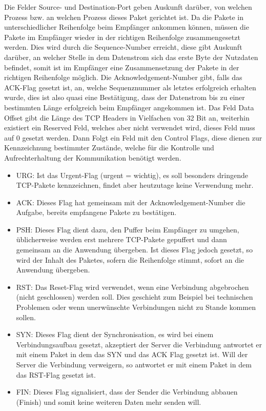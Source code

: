 \documentclass[a4paper,14pt,headsepline]{scrartcl}
\begin{document}
Die Felder Source- und Destination-Port geben Auskunft darüber, von welchen Prozess bzw. an welchen Prozess dieses Paket gerichtet ist. Da die Pakete in unterschiedlicher Reihenfolge beim Empfänger ankommen können, müssen die Pakete im Empfänger wieder in der richtigen Reihenfolge zusammengesetzt werden. Dies wird durch die Sequence-Number erreicht, diese gibt Auskunft darüber, an welcher Stelle in dem Datenstrom sich das erste Byte der Nutzdaten befindet, somit ist im Empfänger eine Zusammensetzung der Pakete in der richtigen Reihenfolge möglich. Die Acknowledgement-Number gibt, falls das ACK-Flag gesetzt ist, an, welche Sequenznummer als letztes erfolgreich erhalten wurde, dies ist also quasi eine Bestätigung, dass der Datenstrom bis zu einer bestimmten Länge erfolgreich beim Empfänger angekommen ist. Das Feld Data Offset gibt die Länge des TCP Headers in Vielfachen von 32 Bit an, weiterhin existiert ein Reserved Feld, welches aber nicht verwendet wird, dieses Feld muss auf 0 gesetzt werden. Dann Folgt ein Feld mit den Control Flags, diese dienen zur Kennzeichnung bestimmter Zustände, welche für die Kontrolle und Aufrechterhaltung der Kommunikation benötigt werden.

\begin{itemize}
	\item URG: Ist das Urgent-Flag (urgent = wichtig), es soll besonders dringende TCP-Pakete kennzeichnen, findet aber heutzutage keine Verwendung mehr.
	\item ACK: Dieses Flag hat gemeinsam mit der Acknowledgement-Number die Aufgabe, bereits empfangene Pakete zu bestätigen.
	\item PSH: Dieses Flag dient dazu, den Puffer beim Empfänger zu umgehen, üblicherweise werden erst mehrere TCP-Pakete gepuffert und dann gemeinsam an die Anwendung übergeben. Ist dieses Flag jedoch gesetzt, so wird der Inhalt des Paketes, sofern die Reihenfolge stimmt, sofort an die Anwendung übergeben.
	\item RST: Das Reset-Flag wird verwendet, wenn eine Verbindung abgebrochen (nicht geschlossen) werden soll. Dies geschieht zum Beispiel bei technischen Problemen oder wenn unerwünschte Verbindungen nicht zu Stande kommen sollen.
	\item SYN: Dieses Flag dient der Synchronisation, es wird bei einem Verbindungsaufbau gesetzt, akzeptiert der Server die Verbindung antwortet er mit einem Paket in dem das SYN und das ACK Flag gesetzt ist. Will der Server die Verbindung verweigern, so antwortet er mit einem Paket in dem das RST-Flag gesetzt ist.
	\item FIN: Dieses Flag signalisiert, dass der Sender die Verbindung abbauen (Finish) und somit keine weiteren Daten mehr senden will.
\end{itemize}
\end{document}
